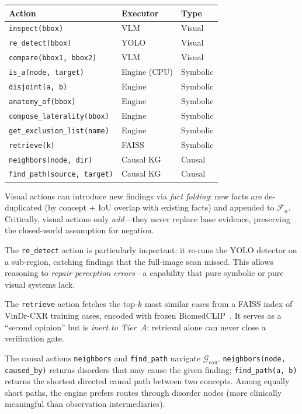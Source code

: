 \documentclass[runningheads]{llncs}
\begin{document}
\begin{center}
\small
\begin{tabular}{lll}
\toprule
\textbf{Action} & \textbf{Executor} & \textbf{Type} \\
\midrule
\texttt{inspect(bbox)}               & VLM   & Visual \\
\texttt{re\_detect(bbox)}            & YOLO  & Visual \\
\texttt{compare(bbox1, bbox2)}       & VLM   & Visual \\
\midrule
\texttt{is\_a(node, target)}         & Engine (CPU) & Symbolic \\
\texttt{disjoint(a, b)}              & Engine       & Symbolic \\
\texttt{anatomy\_of(bbox)}           & Engine       & Symbolic \\
\texttt{compose\_laterality(bbox)}   & Engine       & Symbolic \\
\texttt{get\_exclusion\_list(name)}  & Engine       & Symbolic \\
\texttt{retrieve(k)}                 & FAISS        & Symbolic \\
\midrule
\texttt{neighbors(node, dir)}        & Causal KG    & Causal \\
\texttt{find\_path(source, target)}  & Causal KG    & Causal \\
\bottomrule
\end{tabular}
\end{center}

\noindent
Visual actions can introduce new findings via \emph{fact folding}:
new facts are de-duplicated (by concept + IoU overlap with existing facts)
and appended to $\mathcal{F}_n$.
Critically, visual actions only \emph{add}---they never replace base
evidence, preserving the closed-world assumption for negation.

The \texttt{re\_detect} action is particularly important: it re-runs
the YOLO detector on a sub-region, catching findings that the full-image
scan missed.
This allows reasoning to \emph{repair perception errors}---a capability
that pure symbolic or pure visual systems lack.

The \texttt{retrieve} action fetches the top-$k$ most similar cases from
a FAISS index of VinDr-CXR training cases, encoded with frozen
BiomedCLIP~\cite{zhang2024biomedclip}.
It serves as a ``second opinion'' but is \emph{inert to Tier~A}: retrieval
alone can never close a verification gate.

The causal actions \texttt{neighbors} and \texttt{find\_path} navigate
$\mathcal{G}_{\text{cau}}$.
\texttt{neighbors(node, caused\_by)} returns disorders that may cause the
given finding; \texttt{find\_path(a, b)} returns the shortest directed
causal path between two concepts.
Among equally short paths, the engine prefers routes through disorder nodes
(more clinically meaningful than observation intermediaries).
\end{document}
